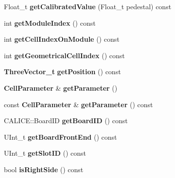 \begin{DoxyCompactItemize}
\item 
Float\-\_\-t {\bfseries get\-Calibrated\-Value} (Float\-\_\-t pedestal) const \label{classCALICE_1_1AdcValueAccess_abfe8b2520316fdaca87fb1643039b706}

\item 
int {\bfseries get\-Module\-Index} () const \label{classCALICE_1_1AdcValueAccess_a95ca34b9e83c716afdf0d759eb674964}

\item 
int {\bfseries get\-Cell\-Index\-On\-Module} () const \label{classCALICE_1_1AdcValueAccess_a0fb4a1dafca50bc1ea71d845c242f9b5}

\item 
int {\bfseries get\-Geometrical\-Cell\-Index} () const \label{classCALICE_1_1AdcValueAccess_a6db60f9998a5eff3616f6cd22187127f}

\item 
{\bf Three\-Vector\-\_\-t} {\bfseries get\-Position} () const \label{classCALICE_1_1AdcValueAccess_a6bdb6f20b6c4f0eb84d664af3046ccd6}

\item 
{\bf Cell\-Parameter} \& {\bfseries get\-Parameter} ()\label{classCALICE_1_1AdcValueAccess_a9adee792205759d44248b3cfd455dcd4}

\item 
const {\bf Cell\-Parameter} \& {\bfseries get\-Parameter} () const \label{classCALICE_1_1AdcValueAccess_a5fb1b775c6659d9e93d67521960b69ea}

\item 
C\-A\-L\-I\-C\-E\-::\-Board\-I\-D {\bfseries get\-Board\-I\-D} () const \label{classCALICE_1_1AdcValueAccess_a5cf394acd1a40ad4d3881e1eadeaa9d0}

\item 
U\-Int\-\_\-t {\bfseries get\-Board\-Front\-End} () const \label{classCALICE_1_1AdcValueAccess_af7af31df48307b706d6f4b3631886a4b}

\item 
U\-Int\-\_\-t {\bfseries get\-Slot\-I\-D} () const \label{classCALICE_1_1AdcValueAccess_a4895d6a36e954e932cdd472096d8261e}

\item 
bool {\bfseries is\-Right\-Side} () const \label{classCALICE_1_1AdcValueAccess_a179dda795ea999d66c7f7cecf7d6de24}

\end{DoxyCompactItemize}
